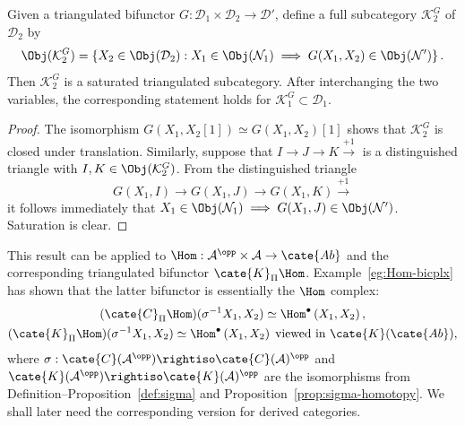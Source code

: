 \begin{lemma}\label{prop:K-cats}
	Given a triangulated bifunctor
	$G:\mathcal{D}_1\times\mathcal{D}_2\to\mathcal{D}'$, define a full
	subcategory $\mathcal{K}_2^G$ of $\mathcal{D}_2$ by
	\[ \Obj(\mathcal{K}_2^G) = \left\{ X_2 \in \Obj(\mathcal{D}_2) : X_1 \in \Obj(\mathcal{N}_1) \implies G(X_1, X_2) \in \Obj(\mathcal{N}') \right\}. \]
	Then $\mathcal{K}_2^G$ is a saturated triangulated subcategory. After
	interchanging the two variables, the corresponding statement holds for
	$\mathcal{K}_1^G\subset\mathcal{D}_1$.
\end{lemma}
\begin{proof}
	The isomorphism $G(X_1,X_2[1])\simeq G(X_1,X_2)[1]$ shows that
	$\mathcal{K}_2^G$ is closed under translation. Similarly, suppose that
	$I\to J\to K\xrightarrow{+1}$ is a distinguished triangle with
	$I,K\in\Obj(\mathcal{K}_2^G)$. From the distinguished triangle
	\[ G(X_1, I) \to G(X_1, J) \to G(X_1, K) \xrightarrow{+1} \]
	it follows immediately that
	$X_1\in\Obj(\mathcal{N}_1)\implies
	G(X_1,J)\in\Obj(\mathcal{N}')$. Saturation is clear.
\end{proof}

This result can be applied to
$\Hom:\mathcal{A}^{\opp}\times\mathcal{A}\to\cate{Ab}$ and the
corresponding triangulated bifunctor $\cate{K}_{\Pi}\Hom$.
Example~\ref{eg:Hom-bicplx} has shown that the latter bifunctor is essentially
the $\Hom$ complex:
\begin{equation}\label{eqn:CPiHom}\begin{gathered}
	(\cate{C}_{\Pi} \Hom)(\sigma^{-1} X_1, X_2) \simeq \Hom^\bullet\left( X_1, X_2 \right), \\
	(\cate{K}_\Pi \Hom)(\sigma^{-1} X_1, X_2) \simeq \Hom^\bullet\left( X_1, X_2 \right)\; \text{viewed in $\cate{K}(\cate{Ab})$},
\end{gathered}\end{equation}
where $\sigma:\cate{C}(\mathcal{A}^{\opp})\rightiso
\cate{C}(\mathcal{A})^{\opp}$ and
$\cate{K}(\mathcal{A}^{\opp})\rightiso\cate{K}(\mathcal{A})^{\opp}$ are
the isomorphisms from Definition--Proposition~\ref{def:sigma} and
Proposition~\ref{prop:sigma-homotopy}. We shall later need the corresponding
version for derived categories.

